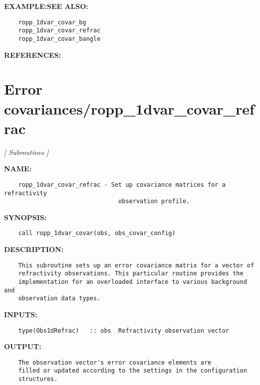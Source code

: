 \textbf{EXAMPLE:}\hspace{0.08in}\textbf{SEE ALSO:}\hspace{0.08in}\begin{Verbatim}
    ropp_1dvar_covar_bg
    ropp_1dvar_covar_refrac
    ropp_1dvar_covar_bangle
\end{Verbatim}
\textbf{REFERENCES:}\hspace{0.08in}\section{Error covariances/ropp\_1dvar\_covar\_refrac}
\textsl{[ Subroutines ]}

\label{ch:robo14}
\label{ch:Error_covariances_ropp_1dvar_covar_refrac}
\textbf{NAME:}\hspace{0.08in}\begin{Verbatim}
    ropp_1dvar_covar_refrac - Set up covariance matrices for a refractivity
                                observation profile.
\end{Verbatim}
\textbf{SYNOPSIS:}\hspace{0.08in}\begin{Verbatim}
    call ropp_1dvar_covar(obs, obs_covar_config)
\end{Verbatim}
\textbf{DESCRIPTION:}\hspace{0.08in}\begin{Verbatim}
    This subroutine sets up an error covariance matrix for a vector of 
    refractivity observations. This particular routine provides the 
    implementation for an overloaded interface to various background and 
    observation data types.
\end{Verbatim}
\textbf{INPUTS:}\hspace{0.08in}\begin{Verbatim}
    type(Obs1dRefrac)   :: obs  Refractivity observation vector
\end{Verbatim}
\textbf{OUTPUT:}\hspace{0.08in}\begin{Verbatim}
    The observation vector's error covariance elements are
    filled or updated according to the settings in the configuration
    structures. 
\end{Verbatim}
